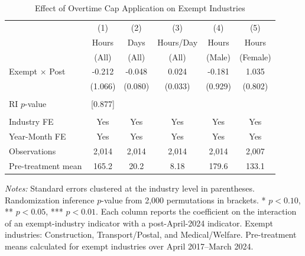 \begin{table}[H]
\centering
\caption{Effect of Overtime Cap Application on Exempt Industries}
\label{tab:main}
\begin{threeparttable}
\begin{tabular}{lccccc}
\toprule
& (1) & (2) & (3) & (4) & (5) \\
& Hours & Days & Hours/Day & Hours & Hours \\
& (All) & (All) & (All) & (Male) & (Female) \\
\midrule
Exempt $\times$ Post & -0.212 & -0.048 & 0.024 & -0.181 & 1.035 \\
& (1.066) & (0.080) & (0.033) & (0.929) & (0.802) \\
\\
RI $p$-value & [0.877] & & & & \\
\\
Industry FE & Yes & Yes & Yes & Yes & Yes \\
Year-Month FE & Yes & Yes & Yes & Yes & Yes \\
Observations & 2,014 & 2,014 & 2,014 & 2,014 & 2,007 \\
Pre-treatment mean & 165.2 & 20.2 & 8.18 & 179.6 & 133.1 \\
\bottomrule
\end{tabular}
\begin{tablenotes}[flushleft]
\small
\item \textit{Notes:} Standard errors clustered at the industry level in parentheses. Randomization inference $p$-value from 2,000 permutations in brackets. * $p<0.10$, ** $p<0.05$, *** $p<0.01$. Each column reports the coefficient on the interaction of an exempt-industry indicator with a post-April-2024 indicator. Exempt industries: Construction, Transport/Postal, and Medical/Welfare. Pre-treatment means calculated for exempt industries over April 2017--March 2024.
\end{tablenotes}
\end{threeparttable}
\end{table}
